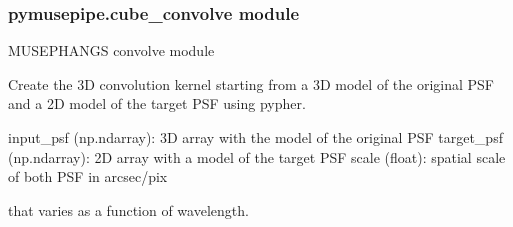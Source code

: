 \documentclass[letterpaper,10pt,english]{sphinxmanual}
\begin{document}
\subsubsection{pymusepipe.cube\_convolve module}
\label{\detokenize{api/pymusepipe:module-pymusepipe.cube_convolve}}\label{\detokenize{api/pymusepipe:pymusepipe-cube-convolve-module}}
\sphinxAtStartPar
MUSE\sphinxhyphen{}PHANGS convolve module

\begin{fulllineitems}
\label{\detokenize{api/pymusepipe:pymusepipe.cube_convolve.convolution_kernel}}
\pysigstartsignatures
{}
\pysigstopsignatures
\sphinxAtStartPar
Create the 3D convolution kernel starting from a 3D model of the original
PSF and a 2D model of the target PSF using pypher.
\begin{description}
\sphinxAtStartPar
input\_psf (np.ndarray): 3D array with the model of the original PSF
target\_psf (np.ndarray): 2D array with a model of the target PSF
scale (float): spatial scale of both PSF in arcsec/pix

\begin{description}
\sphinxAtStartPar
that varies as a function of wavelength.

\end{description}

\end{description}

\end{fulllineitems}

\end{document}
